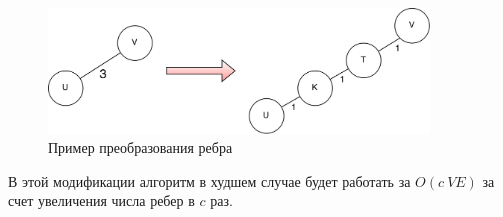 \FloatBarrier
\begin{figure}[h]
\centering
\includegraphics[width=0.9\textwidth]{img/floyd_social_modification.png}
\caption{Пример преобразования ребра}
\label{edge_modification}
\end{figure}
\FloatBarrier

В этой модификации алгоритм в худшем случае будет работать за $O(c \ VE)$ за счет увеличения числа ребер в $c$ раз.

